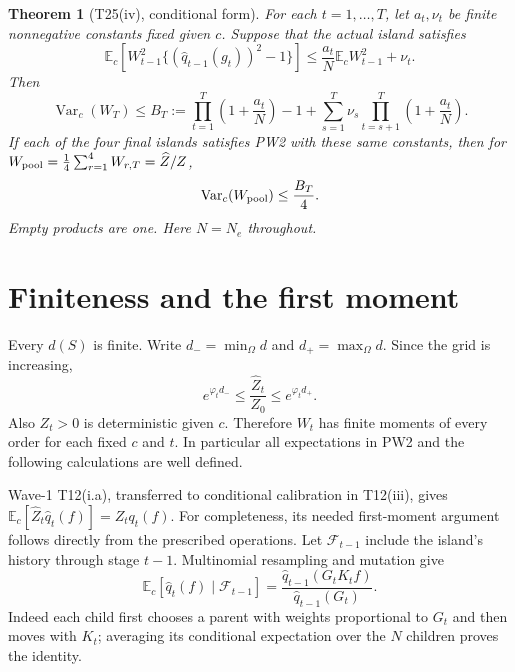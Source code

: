 \documentclass[11pt]{article}
\newcommand{\Ec}{\mathbb E_c}
\newcommand{\Vc}{\operatorname{Var}_c}
\newcommand{\qh}{\widehat q}
\newcommand{\Zh}{\widehat Z}
\newtheorem{theorem}{Theorem}
\begin{document}
\begin{theorem}[T25(iv), conditional form]\label{thm:main}
For each $t=1,\ldots,T$, let $a_t,\nu_t$ be finite nonnegative constants
fixed given $c$. Suppose that the actual island satisfies
\begin{equation}\tag{PW2}\label{eq:pw2}
 \Ec\!\left[W_{t-1}^2
       \{(\qh_{t-1}(g_t))^2-1\}\right]
 \le \frac{a_t}{N}\Ec W_{t-1}^2+\nu_t.
\end{equation}
Then
\begin{equation}\label{eq:bound}
 \Vc(W_T)\le B_T:=
 \prod_{t=1}^T\left(1+\frac{a_t}{N}\right)-1
 +\sum_{s=1}^T\nu_s
       \prod_{t=s+1}^T\left(1+\frac{a_t}{N}\right).
\end{equation}
If each of the four final islands satisfies PW2 with these same constants,
then for $W_{\rm pool}=\frac14\sum_{r=1}^4 W_{r,T}=\Zh/Z$,
\begin{equation}\label{eq:poolbound}
 \Vc(W_{\rm pool})\le\frac{B_T}{4}.
\end{equation}
Empty products are one. Here $N=N_e$ throughout.
\end{theorem}

\section{Finiteness and the first moment}
Every $d(S)$ is finite. Write $d_- =\min_\Omega d$ and
$d_+=\max_\Omega d$. Since the grid is increasing,
\[
 e^{\varphi_t d_-}\le \frac{\Zh_t}{Z_0}
                       \le e^{\varphi_t d_+}.
\]
Also $Z_t>0$ is deterministic given $c$. Therefore $W_t$ has finite
moments of every order for each fixed $c$ and $t$. In particular all
expectations in PW2 and the following calculations are well defined.

Wave-1 T12(i.a), transferred to conditional calibration in T12(iii),
gives $\Ec[\Zh_t\qh_t(f)]=Z_tq_t(f)$. For completeness, its needed
first-moment argument follows directly from the prescribed operations.
Let $\mathcal F_{t-1}$ include the island's history through stage
$t-1$. Multinomial resampling and mutation give
\begin{equation}\label{eq:condmean}
 \mathbb E_c[\qh_t(f)\mid\mathcal F_{t-1}]
 =\frac{\qh_{t-1}(G_t K_t f)}{\qh_{t-1}(G_t)}.
\end{equation}
Indeed each child first chooses a parent with weights proportional to
$G_t$ and then moves with $K_t$; averaging its conditional expectation
over the $N$ children proves the identity.
\end{document}
